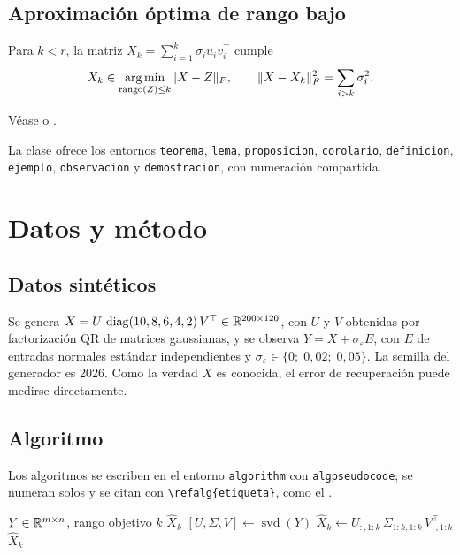 \subsection{Aproximación óptima de rango bajo}

\begin{teorema}
\label{teo:ey}
Para $k<r$, la matriz $X_k=\sum_{i=1}^{k}\sigma_i u_i v_i^{\top}$ cumple
\begin{equation}
  X_k \in \operatorname*{arg\,min}_{\operatorname{rango}(Z)\le k}\lVert X-Z\rVert_F,
  \qquad
  \lVert X-X_k\rVert_F^2=\sum_{i>k}\sigma_i^2 .
  \label{eq:ey}
\end{equation}
\end{teorema}

\begin{demostracion}
Véase \citet{eckart1936approximation} o \citet[sec.~2.4]{golub2013matrix}.
\end{demostracion}

La clase ofrece los entornos \texttt{teorema}, \texttt{lema}, \texttt{proposicion}, \texttt{corolario}, \texttt{definicion}, \texttt{ejemplo}, \texttt{observacion} y \texttt{demostracion}, con numeración compartida.

\section{Datos y método}
\label{sec:metodo}

\subsection{Datos sintéticos}

Se genera $X=U\,\operatorname{diag}(10,8,6,4,2)\,V^{\top}\in\mathbb{R}^{200\times120}$, con $U$ y $V$ obtenidas por factorización QR de matrices gaussianas, y se observa $Y=X+\sigma_\varepsilon E$, con $E$ de entradas normales estándar independientes y $\sigma_\varepsilon\in\{0;\;0{,}02;\;0{,}05\}$. La semilla del generador es 2026. Como la verdad $X$ es conocida, el error de recuperación puede medirse directamente.

\subsection{Algoritmo}

Los algoritmos se escriben en el entorno \texttt{algorithm} con \texttt{algpseudocode}; se numeran solos y se citan con \verb|\refalg{etiqueta}|, como el .

\begin{algorithm}[htbp]
\caption{Aproximación de rango $k$ por SVD truncada.}
\label{alg:svdt}
\begin{algorithmic}[1]
\Require $Y\in\mathbb{R}^{m\times n}$, rango objetivo $k$
\Ensure $\widehat{X}_k$
\State $[U,\Sigma,V]\gets\operatorname{svd}(Y)$ 
\State $\widehat{X}_k\gets U_{:,1:k}\,\Sigma_{1:k,1:k}\,V_{:,1:k}^{\top}$
\State \Return $\widehat{X}_k$
\end{algorithmic}
\end{algorithm}

